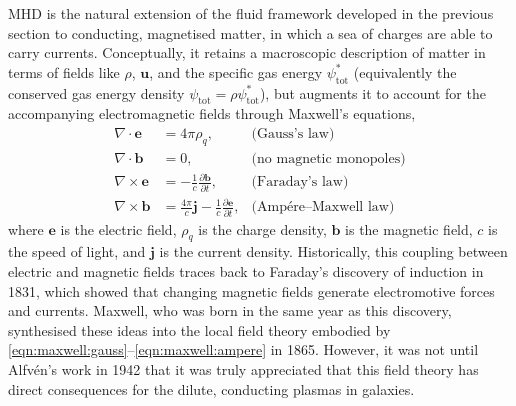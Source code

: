 \documentclass[12pt,twoside]{extreport}
\newcommand{\mDiv}[1]{\nabla \cdot #1} %
\newcommand{\mCurl}[1]{\nabla \times #1} %
\newcommand{\mVector}[1]{\bm{#1}} %
\newcommand{\mpp}[1]{\partial #1}
\newcommand{\mppFrac}[2]{\frac{\mpp{#1}}{\mpp{#2}}}
\begin{document}
MHD is the natural extension of the fluid framework developed in the previous section to conducting, magnetised matter, in which a sea of charges are able to carry currents. Conceptually, it retains a macroscopic description of matter in terms of fields like $\rho$, $\mVector{u}$, and the specific gas energy $\psi^{*}_\mathrm{tot}$ (equivalently the conserved gas energy density $\psi_\mathrm{tot} = \rho \psi^{*}_\mathrm{tot}$), but augments it to account for the accompanying electromagnetic fields through Maxwell's equations,
\begin{align}
    \mDiv{\mVector{e}}
        &= 4\pi \rho_q
        , & \mbox{(Gauss's law)} \label{eqn:maxwell:gauss} \\
    \mDiv{\mVector{b}}
        &= 0
        , & \mbox{(no magnetic monopoles)} \label{eqn:mhd:monopoles} \\
    \mCurl{\mVector{e}}
        &= -\frac{1}{c} \mppFrac{\mVector{b}}{t}
        , & \mbox{(Faraday's law)} \label{eqn:maxwell:faraday} \\
    \mCurl{\mVector{b}}
        &= \frac{4\pi}{c} \mVector{j} - \frac{1}{c} \mppFrac{\mVector{e}}{t}
        , & \mbox{(Amp\'ere--Maxwell law)} \label{eqn:maxwell:ampere}
\end{align}
where $\mVector{e}$ is the electric field, $\rho_q$ is the charge density, $\mVector{b}$ is the magnetic field, $c$ is the speed of light, and $\mVector{j}$ is the current density. Historically, this coupling between electric and magnetic fields traces back to Faraday's discovery of induction in 1831, which showed that changing magnetic fields generate electromotive forces and currents. Maxwell, who was born in the same year as this discovery, synthesised these ideas into the local field theory embodied by \autoref{eqn:maxwell:gauss}--\ref{eqn:maxwell:ampere} in 1865. However, it was not until Alfv\'en's work in 1942 that it was truly appreciated that this field theory has direct consequences for the dilute, conducting plasmas in galaxies.
\end{document}
